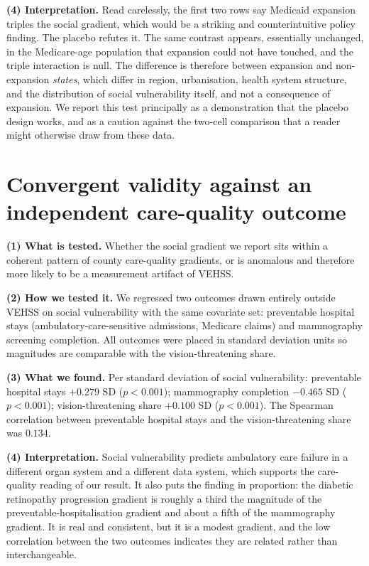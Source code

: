 \documentclass[11pt]{article}
\newcommand{\tpart}[1]{\medskip\noindent\textbf{#1}\quad}
\begin{document}
\tpart{(4) Interpretation.} Read carelessly, the first two rows say Medicaid
expansion triples the social gradient, which would be a striking and
counterintuitive policy finding. The placebo refutes it. The same contrast
appears, essentially unchanged, in the Medicare-age population that expansion
could not have touched, and the triple interaction is null. The difference is
therefore between expansion and non-expansion \emph{states}, which differ in
region, urbanisation, health system structure, and the distribution of social
vulnerability itself, and not a consequence of expansion. We report this test
principally as a demonstration that the placebo design works, and as a caution
against the two-cell comparison that a reader might otherwise draw from these
data.

\section{Convergent validity against an independent care-quality outcome}

\tpart{(1) What is tested.} Whether the social gradient we report sits within a
coherent pattern of county care-quality gradients, or is anomalous and therefore
more likely to be a measurement artifact of VEHSS.

\tpart{(2) How we tested it.} We regressed two outcomes drawn entirely outside
VEHSS on social vulnerability with the same covariate set: preventable hospital
stays (ambulatory-care-sensitive admissions, Medicare claims) and mammography
screening completion. All outcomes were placed in standard deviation units so
magnitudes are comparable with the vision-threatening share.

\tpart{(3) What we found.} Per standard deviation of social vulnerability:
preventable hospital stays $+0.279$ SD ($p<0.001$); mammography completion
$-0.465$ SD ($p<0.001$); vision-threatening share $+0.100$ SD ($p<0.001$). The
Spearman correlation between preventable hospital stays and the
vision-threatening share was $0.134$.

\tpart{(4) Interpretation.} Social vulnerability predicts ambulatory care
failure in a different organ system and a different data system, which supports
the care-quality reading of our result. It also puts the finding in proportion:
the diabetic retinopathy progression gradient is roughly a third the magnitude
of the preventable-hospitalisation gradient and about a fifth of the
mammography gradient. It is real and consistent, but it is a modest gradient,
and the low correlation between the two outcomes indicates they are related
rather than interchangeable.
\end{document}
